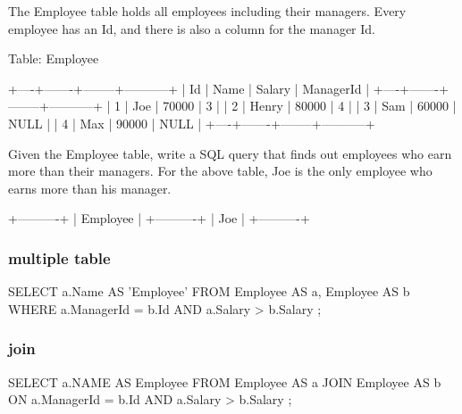 The Employee table holds all employees including their managers. Every employee has an Id, and there is also a column for the manager Id.

Table: Employee
\begin{Code}
+----+-------+--------+-----------+
| Id | Name  | Salary | ManagerId |
+----+-------+--------+-----------+
| 1  | Joe   | 70000  | 3         |
| 2  | Henry | 80000  | 4         |
| 3  | Sam   | 60000  | NULL      |
| 4  | Max   | 90000  | NULL      |
+----+-------+--------+-----------+
\end{Code}

Given the Employee table, write a SQL query that finds out employees who earn more than their managers. For the above table, Joe is the only employee who earns more than his manager.

\begin{Code}
+----------+
| Employee |
+----------+
| Joe      |
+----------+
\end{Code}


\subsubsection{multiple table}
\begin{Code}
SELECT
    a.Name AS 'Employee'
FROM
    Employee AS a,
    Employee AS b
WHERE
    a.ManagerId = b.Id
        AND a.Salary > b.Salary
;
\end{Code}

\subsubsection{join}
\begin{Code}
SELECT
     a.NAME AS Employee
FROM Employee AS a JOIN Employee AS b
     ON a.ManagerId = b.Id
     AND a.Salary > b.Salary
;
\end{Code}
